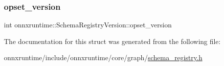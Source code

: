 \subsubsection{\texorpdfstring{opset\+\_\+version}{opset\_version}}
{\footnotesize\ttfamily int onnxruntime\+::\+Schema\+Registry\+Version\+::opset\+\_\+version}



The documentation for this struct was generated from the following file\+:\begin{DoxyCompactItemize}
\item 
onnxruntime/include/onnxruntime/core/graph/\mbox{\hyperlink{schema__registry_8h}{schema\+\_\+registry.\+h}}\end{DoxyCompactItemize}
